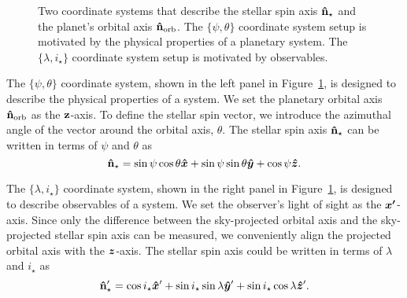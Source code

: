 \documentclass[twocolumn,times,linenumbers]{aastex631}
\begin{document}
\begin{figure*}[ht!]
    \vspace*{-1cm}
    \caption{Two coordinate systems that describe the stellar spin axis $\vb{\hat{n}_\star}$ and the planet's orbital axis $\vb{\hat{n}_{\rm orb}}$. The $\{\psi, \theta\}$ coordinate system setup is motivated by the physical properties of a planetary system. The $\{\lambda, i_\star\}$ coordinate system setup is motivated by observables.}
    \label{fig:coord}
\end{figure*}

The $\{\psi, \theta\}$ coordinate system, shown in the left panel in Figure~\ref{fig:coord}, is designed to describe the physical properties of a system. We set the planetary orbital axis $\vb{\hat{n}_{\rm orb}}$ as the $\vb{z}$-axis.
To define the stellar spin vector, we introduce the azimuthal angle of the vector around the orbital axis, $\theta$. 
The stellar spin axis $\vb{\hat{n}_\star}$ can be written in terms of $\psi$ and $\theta$ as
\begin{equation}
    \vb{\hat{n}_\star} = \sin{\psi}\cos{\theta}\vu*{x} + \sin{\psi}\sin{\theta}\vu*{y} + \cos{\psi}\vu*{z}.
\end{equation}

The $\{\lambda, i_\star\}$ coordinate system, shown in the right panel in Figure~\ref{fig:coord}, is designed to describe observables of a system. We set the observer's light of sight as the $\vb*{x'}$-axis.
Since only the difference between the sky-projected orbital axis and the sky-projected stellar spin axis can be measured, we conveniently align the projected orbital axis with the $\vb*{z}$-axis.
The stellar spin axis could be written in terms of $\lambda$ and $i_\star$ as 
\begin{equation}\label{eqn:nstar1}
    \vb{\hat{n}_\star}' = \cos{i_\star}\vu*{x}' + \sin{i_\star}\sin{\lambda}\vu*{y}' + \sin{i_\star}\cos{\lambda}\vu*{z}'.
\end{equation}
\end{document}
